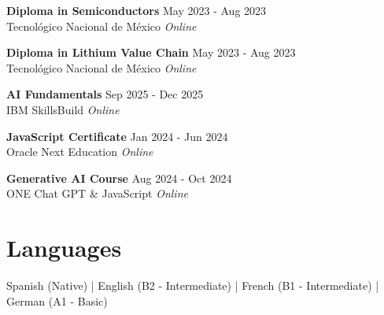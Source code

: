 \documentclass[10pt,a4paper]{article}
\newcommand{\eduexp}[4]{
    \textbf{#1} \hfill #2\\
    \textcolor{primary}{#3} \hfill \textit{#4}\vspace{5pt}
    \vspace{4pt}
}
\begin{document}
\eduexp{Diploma in Semiconductors}{May 2023 - Aug 2023}{Tecnológico Nacional de México}{Online}

\eduexp{Diploma in Lithium Value Chain}{May 2023 - Aug 2023}{Tecnológico Nacional de México}{Online}

\eduexp{AI Fundamentals}{Sep 2025 - Dec 2025}{IBM SkillsBuild}{Online}

\eduexp{JavaScript Certificate}{Jan 2024 - Jun 2024}{Oracle Next Education}{Online}

\eduexp{Generative AI Course}{Aug 2024 - Oct 2024}{ONE Chat GPT \& JavaScript}{Online}

\section*{Languages} 
Spanish (Native) \hfill | \hfill English (B2 - Intermediate) \hfill| \hfill French (B1 - Intermediate) \hfill | \hfill German (A1 - Basic)
\end{document}
